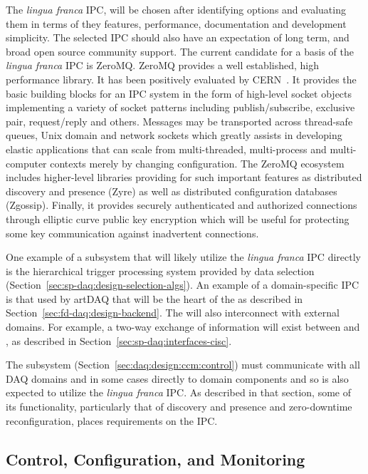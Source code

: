 The \textit{lingua franca} IPC, will be chosen after identifying options and evaluating them in terms of they features, performance, documentation and development simplicity. 
The selected IPC should also have an expectation of long term, and broad open source community support. 
The current candidate for a basis of the \textit{lingua franca} IPC is ZeroMQ. 
ZeroMQ provides a well established, high performance library. 
It has been positively evaluated by CERN~\cite{Dworak:2012mf}. 
It provides the basic building blocks for an IPC system in the form of high-level socket objects implementing a variety of socket patterns including publish/subscribe, exclusive pair, request/reply and others. 
Messages may be transported across thread-safe queues, Unix domain and network sockets which greatly assists in developing elastic applications that can scale from multi-threaded, multi-process and multi-computer contexts merely by changing configuration. 
The ZeroMQ ecosystem includes higher-level libraries providing for such important features as distributed discovery and presence (Zyre) as well as distributed configuration databases (Zgossip). 
Finally, it provides securely authenticated and authorized connections through elliptic curve public key encryption which will be useful for protecting some key communication against inadvertent connections.

One example of a subsystem that will likely utilize the \textit{lingua franca} IPC directly is the hierarchical trigger processing system provided by data selection (Section~\ref{sec:sp-daq:design-selection-algs}).
An example of a domain-specific IPC is that used by artDAQ that will be the heart of the  as described in Section~\ref{sec:fd-daq:design-backend}.
The  will also interconnect with external domains. 
For example, a two-way exchange of information will exist between  and , as described in Section~\ref{sec:sp-daq:interfaces-cisc}.  

The  subsystem (Section~\ref{sec:daq:design:ccm:control}) must communicate with all DAQ domains and in some cases directly to domain components and so is also expected to utilize the \textit{lingua franca} IPC. 
As described in that section, some of its functionality, particularly that of discovery and presence and zero-downtime reconfiguration, places requirements on the IPC.



\subsection{Control, Configuration, and Monitoring}
\label{sec:fd-daq:design-run-control}

